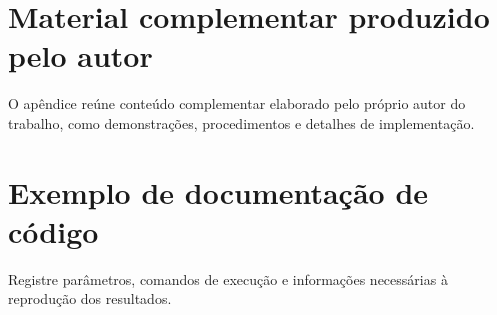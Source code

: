 \begin{apendicesenv}\partapendices
\chapter{Material complementar produzido pelo autor}
O apêndice reúne conteúdo complementar elaborado pelo próprio autor do trabalho, como demonstrações, procedimentos e detalhes de implementação.
\chapter{Exemplo de documentação de código}
Registre parâmetros, comandos de execução e informações necessárias à reprodução dos resultados.
\end{apendicesenv}
